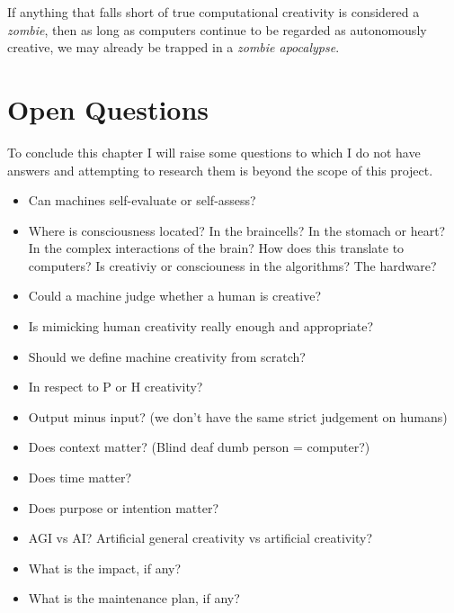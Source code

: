 If anything that falls short of true computational creativity is considered a \textit{zombie}, then as long as computers continue to be regarded as autonomously creative, we may already be trapped in a \textit{zombie apocalypse}.


\section{Open Questions}

To conclude this chapter I will raise some questions to which I do not have answers and attempting to research them is beyond the scope of this project.


\begin{itemize}
  \item Can machines self-evaluate or self-assess?
  \item Where is consciousness located? In the braincells? In the stomach or heart? In the complex interactions of the brain? How does this translate to computers? Is creativiy or consciouness in the algorithms? The hardware?
  \item Could a machine judge whether a human is creative?
  \item Is mimicking human creativity really enough and appropriate?
  \item Should we define machine creativity from scratch?
  \item In respect to P or H creativity?
  \item Output minus input? (we don’t have the same strict judgement on humans)
  \item Does context matter? (Blind deaf dumb person = computer?)
  \item Does time matter?
  \item Does purpose or intention matter?
  \item AGI vs AI? Artificial general creativity vs artificial creativity?
  \item What is the impact, if any?
  \item What is the maintenance plan, if any?
\end{itemize}

